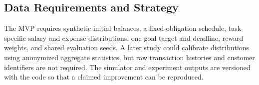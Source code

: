 \subsection{Data Requirements and Strategy}
The MVP requires synthetic initial balances, a fixed-obligation schedule, task-specific salary and expense distributions, one goal target and deadline, reward weights, and shared evaluation seeds. A later study could calibrate distributions using anonymized aggregate statistics, but raw transaction histories and customer identifiers are not required. The simulator and experiment outputs are versioned with the code so that a claimed improvement can be reproduced.

